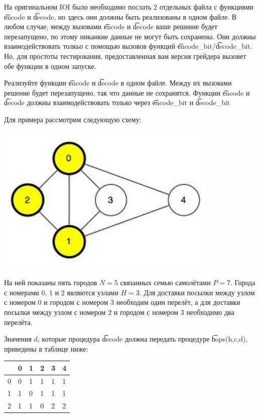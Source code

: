 На оригинальном IOI было необходимо послать 2 отдельных файла с функциями \t{encode} и \t{decode}, но здесь они должны быть реализованы в одном файле. В любом случае, между вызовами \t{encode} и \t{decode} ваше решение будет перезапущено, по этому никаикие данные не могут быть сохранены. Они должны взаимодействовать толкьо с помощью вызовов функций  \t{encode\_bit}/\t{decode\_bit}. Но, для простоты тестирования, предоставленная вам версия грейдера вызовет обе функции в одном запуске. 


Реализуйте функции \t{encode} и \t{decode} в одном файле. Между их вызовами решение будет перезапущено, так что данные не сохранятся. Функции \t{encode} и \t{decode} должны взаимодействовать только через \t{encode\_bit} и \t{decode\_bit}

Для примера рассмотрим следующую схему:

\includegraphics{SaveitSample.png}

На ней показаны пять городов $N=5$ связанных семью самолётами $P=7$. Города с номерами $0$, $1$ и $2$ являются узлами $H=3$. Для доставки посылки между узлом с номером $0$ и городом с номером $3$ необходим один перелёт, а для доставки посылки между узлом с номером $2$ и городом с номером $3$ необходимо два перелёта.

Значения $d$, которые процедура \t{decode} должна передать процедуре \t{hops(h,c,d)}, приведены в таблице ниже:

\begin{tabular}{|l|l|l|l|l|l|}
\hline
  & 0 & 1 & 2 & 3 & 4 \\ \hline
0 & 0 & 1 & 1 & 1 & 1 \\ \hline
1 & 1 & 0 & 1 & 1 & 1 \\ \hline
2 & 1 & 1 & 0 & 2 & 2 \\ \hline
\end{tabular}